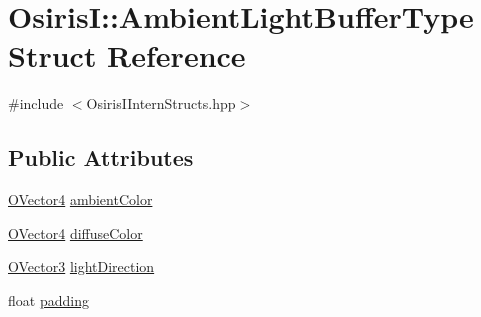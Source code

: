 \hypertarget{struct_osiris_i_1_1_ambient_light_buffer_type}{\section{Osiris\-I\-:\-:Ambient\-Light\-Buffer\-Type Struct Reference}
\label{struct_osiris_i_1_1_ambient_light_buffer_type}
}


{\ttfamily \#include $<$Osiris\-I\-Intern\-Structs.\-hpp$>$}

\subsection*{Public Attributes}
\begin{DoxyCompactItemize}
\item 
\hyperlink{struct_osiris_i_1_1_o_vector4}{O\-Vector4} \hyperlink{struct_osiris_i_1_1_ambient_light_buffer_type_a3388b7aa54444586646b544223a18fd8}{ambient\-Color}
\item 
\hyperlink{struct_osiris_i_1_1_o_vector4}{O\-Vector4} \hyperlink{struct_osiris_i_1_1_ambient_light_buffer_type_abae921154751d8dd7204774a02cd3eb0}{diffuse\-Color}
\item 
\hyperlink{struct_osiris_i_1_1_o_vector3}{O\-Vector3} \hyperlink{struct_osiris_i_1_1_ambient_light_buffer_type_ab8f2d04b57be3dcb0f1ade7a850584fa}{light\-Direction}
\item 
float \hyperlink{struct_osiris_i_1_1_ambient_light_buffer_type_a95d9792e40d8f220f9bb433543f237d3}{padding}
\end{DoxyCompactItemize}


